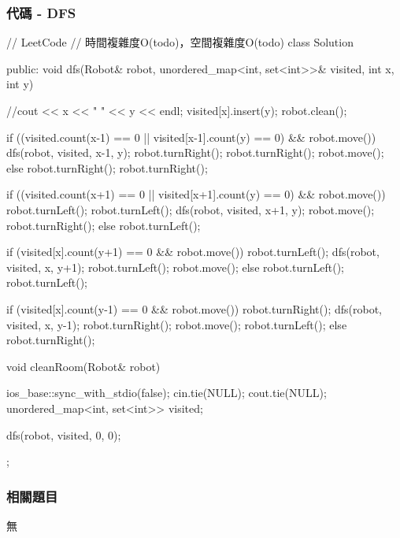 \subsubsection{代碼 - DFS}
\begin{Code}
// LeetCode
// 時間複雜度O(todo)，空間複雜度O(todo)
class Solution {
public:
    void dfs(Robot& robot, unordered_map<int, set<int>>& visited, int x, int y)
    {
        //cout << x << " " << y << endl;
        visited[x].insert(y);
        robot.clean();

        if ((visited.count(x-1) == 0 || visited[x-1].count(y) == 0) &&
            robot.move())
        {
            dfs(robot, visited, x-1, y);
            robot.turnRight();
            robot.turnRight();
            robot.move();
        }
        else
        {
            robot.turnRight();
            robot.turnRight();
        }

        if ((visited.count(x+1) == 0 || visited[x+1].count(y) == 0) &&
            robot.move())
        {
            robot.turnLeft();
            robot.turnLeft();
            dfs(robot, visited, x+1, y);
            robot.move();
            robot.turnRight();
        }
        else
        {
            robot.turnLeft();
        }

        if (visited[x].count(y+1) == 0 &&
            robot.move())
        {
            robot.turnLeft();
            dfs(robot, visited, x, y+1);
            robot.turnLeft();
            robot.move();
        }
        else
        {
            robot.turnLeft();
            robot.turnLeft();
        }

        if (visited[x].count(y-1) == 0 &&
            robot.move())
        {
            robot.turnRight();
            dfs(robot, visited, x, y-1);
            robot.turnRight();
            robot.move();
            robot.turnLeft();
        }
        else
        {
            robot.turnRight();
        }
    }

    void cleanRoom(Robot& robot) {
        ios_base::sync_with_stdio(false);
        cin.tie(NULL);
        cout.tie(NULL);
        unordered_map<int, set<int>> visited;

        dfs(robot, visited, 0, 0);
    }
};
\end{Code}
\subsubsection{相關題目}
\begindot
\item 無
\myenddot


